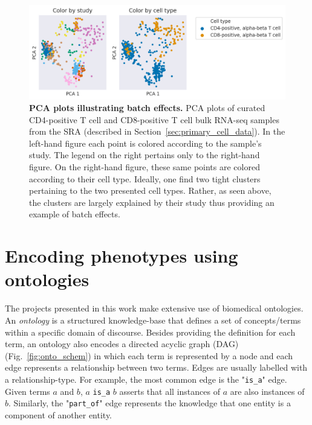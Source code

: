 \begin{figure}[!tpb]
\centerline{\includegraphics[width=13cm]{figures/batch_effects.png}}
\caption{\textbf{PCA plots illustrating batch effects.} PCA plots of curated CD4-positive T cell and CD8-positive T cell bulk RNA-seq samples from the SRA (described in Section~\ref{sec:primary_cell_data}). In the left-hand figure each point is colored according to the sample's study. The legend on the right pertains only to the right-hand figure.  On the right-hand figure, these same points are colored according to their cell type. Ideally, one find two tight clusters pertaining to the two presented cell types. Rather, as seen above, the clusters are largely explained by their study thus providing an example of batch effects.}
\label{fig:batch_effects}
\end{figure}


\section{Encoding phenotypes using ontologies}

The projects presented in this work make extensive use of biomedical ontologies.  An \textit{ontology} is a structured knowledge-base that defines a set of concepts/terms within a specific domain of discourse. Besides providing the definition for each term, an ontology also encodes a directed acyclic graph (DAG) (Fig.~\ref{fig:onto_schem}) in which each term is represented by a node and each edge represents a relationship between two terms. Edges are usually labelled with a relationship-type. For example, the most common edge is the "\texttt{is\_a}" edge. Given terms $a$ and $b$, $a$ \texttt{is\_a} $b$ asserts that all instances of $a$ are also instances of $b$. Similarly, the "\texttt{part\_of}" edge represents the knowledge that one entity is a component of another entity.   

